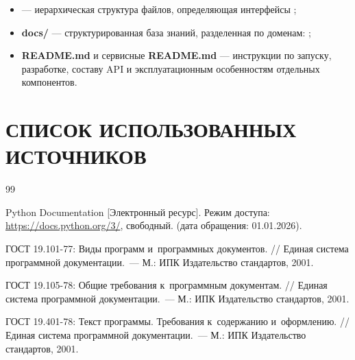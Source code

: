 \documentclass[12pt,a4paper]{extarticle}
\begin{document}
\begin{hseExample}
\begin{itemize}[leftmargin=1.25cm]
    \item \textbf{} --- иерархическая структура файлов, определяющая интерфейсы ;
    \item \textbf{docs/} --- структурированная база знаний, разделенная по доменам: ;
    \item \textbf{README.md} и сервисные \textbf{README.md} --- инструкции по запуску, разработке, составу API и эксплуатационным особенностям отдельных компонентов.
\end{itemize}
\end{hseExample}

\clearpage
\pagestyle{appendix}

\section*{СПИСОК ИСПОЛЬЗОВАННЫХ ИСТОЧНИКОВ}

\renewcommand{\refname}{}
\begin{thebibliography}{99}
\vspace{-1cm}

Python Documentation [Электронный ресурс]. Режим доступа: \url{https://docs.python.org/3/}, свободный. (дата обращения: 01.01.2026).

ГОСТ 19.101-77: Виды программ и~программных документов. // Единая система программной документации.~--- М.: ИПК Издательство стандартов, 2001.

ГОСТ 19.105-78: Общие требования к~программным документам. // Единая система программной документации.~--- М.: ИПК Издательство стандартов, 2001.

ГОСТ 19.401-78: Текст программы. Требования к~содержанию и~оформлению. // Единая система программной документации.~--- М.: ИПК Издательство стандартов, 2001.

\end{thebibliography}



\clearpage


\end{document}
